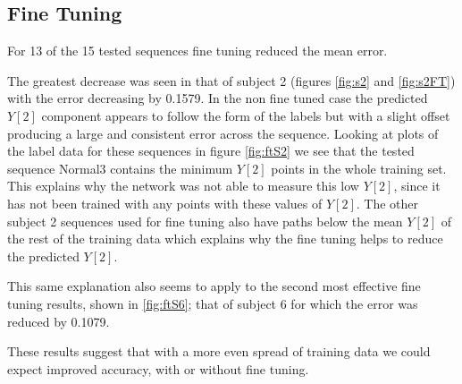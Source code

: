 \documentclass[11pt]{article} %
\begin{document}
\subsection{Fine Tuning}
\label{sec:finetuning}
For 13 of the 15 tested sequences fine tuning reduced the mean error. 


The greatest decrease was seen in that of subject 2 (figures \ref{fig:s2} and \ref{fig:s2FT}) with the error decreasing by 0.1579. In the non fine tuned case the predicted $Y[2]$ component appears to follow the form of the labels but with a slight offset producing a large and consistent error across the sequence. Looking at plots of the label data for these sequences in figure \ref{fig:ftS2} we see that the tested sequence Normal3 contains the minimum $Y[2]$ points in the whole training set. This explains why the network was not able to measure this low $Y[2]$, since it has not been trained with any points with these values of $Y[2]$. The other subject 2 sequences used for fine tuning also have paths below the mean $Y[2]$ of the rest of the training data which explains why the fine tuning helps to reduce the predicted $Y[2]$.

This same explanation also seems to apply to the second most effective fine tuning results, shown in \ref{fig:ftS6}; that of subject 6 for which the error was reduced by 0.1079.

These results suggest that with a more even spread of training data we could expect improved accuracy, with or without fine tuning.
\end{document}
